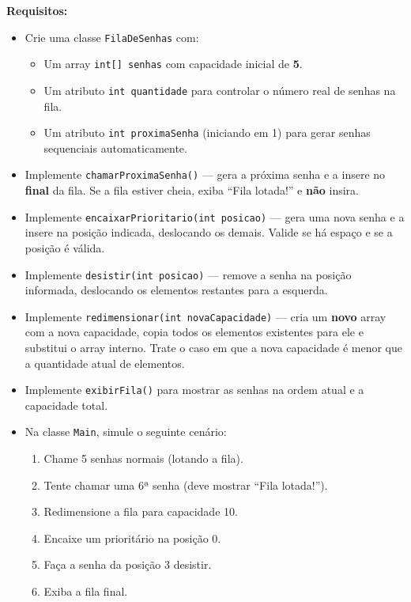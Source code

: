 \documentclass[12pt, a4paper]{article}
\begin{document}
\textbf{Requisitos:}
\begin{itemize}
    \item Crie uma classe \texttt{FilaDeSenhas} com:
    \begin{itemize}
        \item Um array \texttt{int[] senhas} com capacidade inicial de \textbf{5}.
        \item Um atributo \texttt{int quantidade} para controlar o número real de senhas na fila.
        \item Um atributo \texttt{int proximaSenha} (iniciando em 1) para gerar senhas sequenciais automaticamente.
    \end{itemize}
    \item Implemente \texttt{chamarProximaSenha()} — gera a próxima senha e a insere no \textbf{final} da fila. Se a fila estiver cheia, exiba ``Fila lotada!'' e \textbf{não} insira.
    \item Implemente \texttt{encaixarPrioritario(int posicao)} — gera uma nova senha e a insere na posição indicada, deslocando os demais. Valide se há espaço e se a posição é válida.
    \item Implemente \texttt{desistir(int posicao)} — remove a senha na posição informada, deslocando os elementos restantes para a esquerda.
    \item Implemente \texttt{redimensionar(int novaCapacidade)} — cria um \textbf{novo} array com a nova capacidade, copia todos os elementos existentes para ele e substitui o array interno. Trate o caso em que a nova capacidade é menor que a quantidade atual de elementos.
    \item Implemente \texttt{exibirFila()} para mostrar as senhas na ordem atual e a capacidade total.
    \item Na classe \texttt{Main}, simule o seguinte cenário:
    \begin{enumerate}
        \item Chame 5 senhas normais (lotando a fila).
        \item Tente chamar uma 6ª senha (deve mostrar ``Fila lotada!'').
        \item Redimensione a fila para capacidade 10.
        \item Encaixe um prioritário na posição 0.
        \item Faça a senha da posição 3 desistir.
        \item Exiba a fila final.
    \end{enumerate}
\end{itemize}
\end{document}
